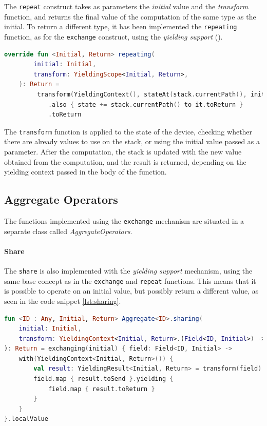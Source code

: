 The \texttt{repeat} construct takes as parameters the \emph{initial} value and the \emph{transform} function, and returns the
final value of the computation of the same type as the initial.
To return a different type, it has been implemented the \texttt{repeating} function, as for the \texttt{exchange} construct,
using the \emph{yielding support} ().

\begin{minipage}{\linewidth}
    \begin{lstlisting}[language=kt,label={lst:repeating},caption={The implementation of the \texttt{repeating} function.}]
     override fun <Initial, Return> repeating(
        initial: Initial,
        transform: YieldingScope<Initial, Return>,
    ): Return =
         transform(YieldingContext(), stateAt(stack.currentPath(), initial))
            .also { state += stack.currentPath() to it.toReturn }
            .toReturn
    \end{lstlisting}
\end{minipage}

The \texttt{transform} function is applied to the state of the device, checking whether there are already values to use
on the stack, or using the initial value passed as a parameter.
After the computation, the stack is updated with the new value obtained from the computation, and the result is returned,
depending on the yielding context passed in the body of the function.

\subsection{Aggregate Operators}
\label{subsec:aggregate-operators}
The functions implemented using the \texttt{exchange} mechanism are situated in a separate class called \emph{AggregateOperators}.

\paragraph{Share}
The \texttt{share} is also implemented with the \emph{yielding support} mechanism, using the same base concept as in the
\texttt{exchange} and \texttt{repeat} functions.
This means that it is possible to operate on an initial value, but possibly return a different value, as seen in the code snippet \ref{lst:sharing}.

\begin{lstlisting}[language=kt,label={lst:sharing},caption={The implementation of the \texttt{sharing} function.}]
fun <ID : Any, Initial, Return> Aggregate<ID>.sharing(
    initial: Initial,
    transform: YieldingContext<Initial, Return>.(Field<ID, Initial>) -> YieldingResult<Initial, Return>,
): Return = exchanging(initial) { field: Field<ID, Initial> ->
    with(YieldingContext<Initial, Return>()) {
        val result: YieldingResult<Initial, Return> = transform(field)
        field.map { result.toSend }.yielding {
            field.map { result.toReturn }
        }
    }
}.localValue
\end{lstlisting}

